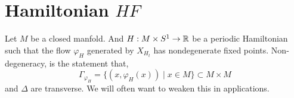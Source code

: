 \documentclass[12pt]{article}
\begin{document}

\section{Hamiltonian $HF$}

Let $M$ be a closed manfold. And $H : M \times S^1 \to \mathbb{R}$ be a periodic Hamiltonian such that the flow $\varphi_H$ generated by $X_{H_t}$ has nondegenerate fixed points. Non-degeneracy, is the statement that,
\[ \Gamma_{\varphi_H} = \{ (x, \varphi_H(x)) \mid x \in M \} \subset M \times M \]
and $\Delta$ are transverse. We will often want to weaken this in applications. 
 
\end{document}
